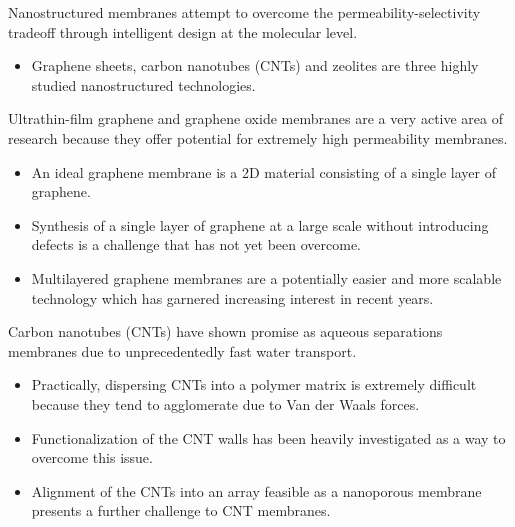 \documentclass{article}
\begin{document}
  Nanostructured membranes attempt to overcome the permeability-selectivity 
  tradeoff through intelligent design at the molecular level.
  \begin{itemize}
	\item Graphene sheets, carbon nanotubes (CNTs) and zeolites are three
	highly studied nanostructured technologies.
  \end{itemize}
  
  Ultrathin-film graphene and graphene oxide membranes are a very active
  area of research because they offer potential for extremely high 
  permeability membranes.
  \begin{itemize}
    \item An ideal graphene membrane is a 2D material consisting of a
    single layer of graphene.\cite{humplik_nanostructured_2011}
    \item Synthesis of a single layer of graphene at a large scale without
    introducing defects is a challenge that has not yet been overcome.
    \item Multilayered graphene membranes are a potentially easier and
    more scalable technology which has garnered increasing interest in
    recent years.\cite{cohen-tanugi_multilayer_2016,wei_multilayred_2018}
  \end{itemize}
  
  Carbon nanotubes (CNTs) have shown promise as aqueous separations membranes due
  to unprecedentedly fast water transport.\cite{humplik_nanostructured_2011,hummer_water_2001} 
  \begin{itemize}
    \item Practically, dispersing CNTs into a polymer matrix is extremely difficult
    because they tend to agglomerate due to Van der Waals forces.
    \item Functionalization of the CNT walls has been heavily investigated 
    as a way to overcome this issue. 
    \item Alignment of the CNTs into an array feasible as a nanoporous
    membrane presents a further challenge to CNT membranes.\cite{sahoo_polymer_2010}
  \end{itemize}
   
\end{document}
